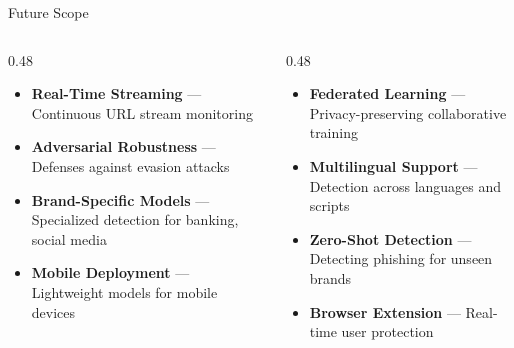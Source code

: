 \documentclass[aspectratio=169,12pt]{beamer}
\begin{document}
\begin{frame}{Future Scope}
    \begin{columns}[T]
        \begin{column}{0.48\textwidth}
            \begin{itemize}
                \item \textbf{Real-Time Streaming} --- Continuous URL stream monitoring
                \vspace{0.3cm}
                \item \textbf{Adversarial Robustness} --- Defenses against evasion attacks
                \vspace{0.3cm}
                \item \textbf{Brand-Specific Models} --- Specialized detection for banking, social media
                \vspace{0.3cm}
                \item \textbf{Mobile Deployment} --- Lightweight models for mobile devices
            \end{itemize}
        \end{column}
        \begin{column}{0.48\textwidth}
            \begin{itemize}
                \item \textbf{Federated Learning} --- Privacy-preserving collaborative training
                \vspace{0.3cm}
                \item \textbf{Multilingual Support} --- Detection across languages and scripts
                \vspace{0.3cm}
                \item \textbf{Zero-Shot Detection} --- Detecting phishing for unseen brands
                \vspace{0.3cm}
                \item \textbf{Browser Extension} --- Real-time user protection
            \end{itemize}
        \end{column}
    \end{columns}
\end{frame}
\end{document}

